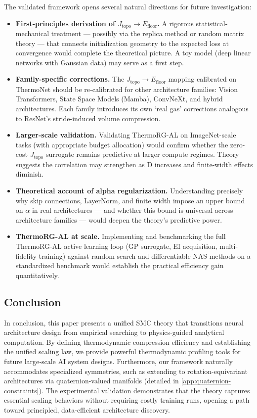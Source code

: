 \documentclass[11pt, a4paper]{article}
\theoremstyle{definition}
\begin{document}
The validated framework opens several natural directions for future investigation:

\begin{itemize}
    \item \textbf{First-principles derivation of $J_\mathrm{topo} \to E_\mathrm{floor}$.} A rigorous statistical-mechanical treatment — possibly via the replica method or random matrix theory — that connects initialization geometry to the expected loss at convergence would complete the theoretical picture. A toy model (deep linear networks with Gaussian data) may serve as a first step.
    
    \item \textbf{Family-specific corrections.} The $J_\mathrm{topo} \to E_\mathrm{floor}$ mapping calibrated on ThermoNet should be re-calibrated for other architecture families: Vision Transformers, State Space Models (Mamba), ConvNeXt, and hybrid architectures. Each family introduces its own `real gas' corrections analogous to ResNet's stride-induced volume compression.
    
    \item \textbf{Larger-scale validation.} Validating ThermoRG-AL on ImageNet-scale tasks (with appropriate budget allocation) would confirm whether the zero-cost $J_\mathrm{topo}$ surrogate remains predictive at larger compute regimes. Theory suggests the correlation may strengthen as D increases and finite-width effects diminish.
    
    \item \textbf{Theoretical account of alpha regularization.} Understanding precisely why skip connections, LayerNorm, and finite width impose an upper bound on $\alpha$ in real architectures — and whether this bound is universal across architecture families — would deepen the theory's predictive power.
    
    \item \textbf{ThermoRG-AL at scale.} Implementing and benchmarking the full ThermoRG-AL active learning loop (GP surrogate, EI acquisition, multi-fidelity training) against random search and differentiable NAS methods on a standardized benchmark would establish the practical efficiency gain quantitatively.
\end{itemize}

\subsection{Conclusion}
In conclusion, this paper presents a unified SMC theory that transitions neural architecture design from empirical searching to physics‑guided analytical computation. By defining thermodynamic compression efficiency and establishing the unified scaling law, we provide powerful thermodynamic profiling tools for future large‑scale AI system designs. Furthermore, our framework naturally accommodates specialized symmetries, such as extending to rotation-equivariant architectures via quaternion-valued manifolds (detailed in \cref{app:quaternion-constraints}). The experimental validation demonstrates that the theory captures essential scaling behaviors without requiring costly training runs, opening a path toward principled, data‑efficient architecture discovery.
\end{document}

